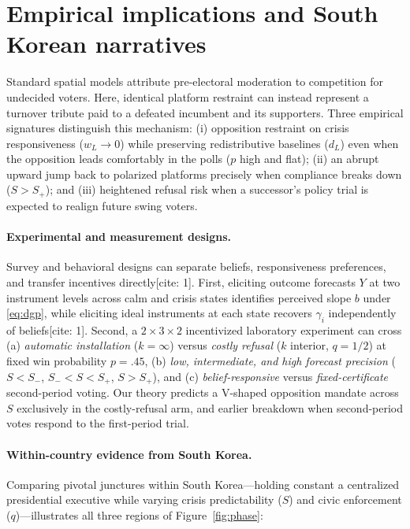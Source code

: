 \section{Empirical implications and South Korean narratives}\label{sec:discussion}

Standard spatial models attribute pre-electoral moderation to competition for undecided voters. Here, identical platform restraint can instead represent a turnover tribute paid to a defeated incumbent and its supporters. Three empirical signatures distinguish this mechanism: (i) opposition restraint on crisis responsiveness ($w_L\to 0$) while preserving redistributive baselines ($d_L$) even when the opposition leads comfortably in the polls ($p$ high and flat); (ii) an abrupt upward jump back to polarized platforms precisely when compliance breaks down ($S>S_+$); and (iii) heightened refusal risk when a successor's policy trial is expected to realign future swing voters.

\paragraph{Experimental and measurement designs.}
Survey and behavioral designs can separate beliefs, responsiveness preferences, and transfer incentives directly[cite: 1]. First, eliciting outcome forecasts $Y$ at two instrument levels across calm and crisis states identifies perceived slope $b$ under \eqref{eq:dgp}, while eliciting ideal instruments at each state recovers $\gamma_i$ independently of beliefs[cite: 1]. Second, a $2\times 3\times 2$ incentivized laboratory experiment can cross (a) \emph{automatic installation} ($k=\infty$) versus \emph{costly refusal} ($k$ interior, $q=1/2$) at fixed win probability $p=.45$, (b) \emph{low, intermediate, and high forecast precision} ($S<S_-$, $S_-<S<S_+$, $S>S_+$), and (c) \emph{belief-responsive} versus \emph{fixed-certificate} second-period voting. Our theory predicts a V-shaped opposition mandate across $S$ exclusively in the costly-refusal arm, and earlier breakdown when second-period votes respond to the first-period trial.

\paragraph{Within-country evidence from South Korea.}
Comparing pivotal junctures within South Korea---holding constant a centralized presidential executive while varying crisis predictability ($S$) and civic enforcement ($q$)---illustrates all three regions of Figure~\ref{fig:phase}:


